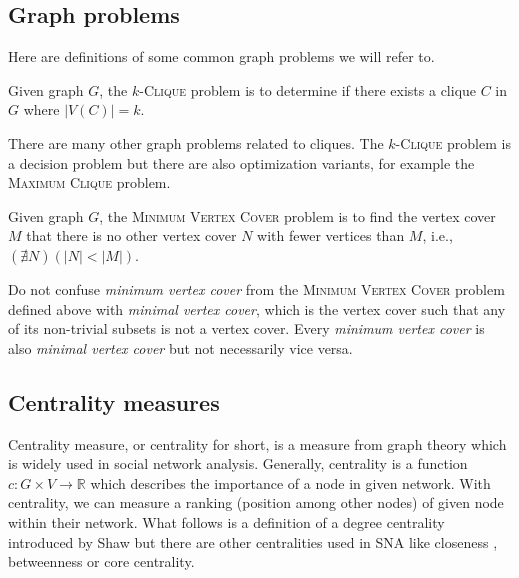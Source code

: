 \subsection{Graph problems}

Here are definitions of some common \NPh graph problems we will refer to.

\begin{definition}
    Given graph $G$, the $k$-\textsc{Clique} problem is to determine if
    there exists a clique $C$ in $G$ where $|V(C)| = k$.
\end{definition}

There are many other graph problems related to cliques. The $k$-\textsc{Clique} problem is a decision problem but
there are also optimization variants, for example the \textsc{Maximum Clique} problem.

\begin{definition}
    Given graph $G$, the \textsc{Minimum Vertex Cover} problem is to find
    the vertex cover $M$ that there is no other vertex cover $N$ with fewer vertices than $M$, i.e., 
    $(\nexists N)(|N| < |M|)$.
\end{definition}

Do not confuse \emph{minimum vertex cover} from the \textsc{Minimum Vertex Cover} problem defined above with \emph{minimal vertex cover},
which is the vertex cover such that any of its non-trivial subsets is not a vertex cover.
Every \emph{minimum vertex cover} is also \emph{minimal vertex cover} but not necessarily vice versa.


\subsection{Centrality measures}

Centrality measure, or centrality for short, is a measure from graph theory which is widely used in social network analysis.
Generally, centrality is a function $c: G \times V \rightarrow \mathbb{R}$ which describes the importance of a node in given network.
With centrality, we can measure a ranking (position among other nodes) of given node within their network.
What follows is a definition of a degree centrality introduced by Shaw \cite{Shaw1954} but there are other centralities used in SNA like
closeness \cite{Beauchamp1965}, betweenness \cite{Anthonisse1971,Freeman1977} or core \cite{Seidman1983} centrality.

